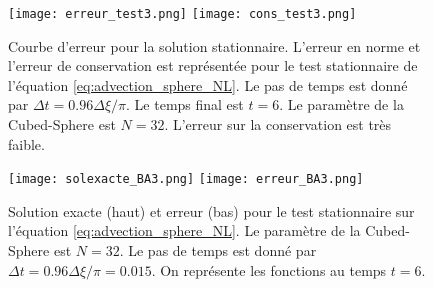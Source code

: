 \begin{figure}[htbp]
\begin{center}
\texttt{[image: erreur\_test3.png]}
\texttt{[image: cons\_test3.png]}
\end{center}
\caption{Courbe d'erreur pour la solution stationnaire. L'erreur en norme et l'erreur de conservation est représentée pour le test stationnaire de l'équation \eqref{eq:advection_sphere_NL}. Le pas de temps est donné par $\Delta t = 0.96 \Delta \xi / \pi$. Le temps final est $t=6$. Le paramètre de la Cubed-Sphere est $N=32$. L'erreur sur la conservation est très faible.}
\label{fig:benartzi_test3_hist}
\end{figure}

\begin{figure}[htbp]
\begin{center}
\texttt{[image: solexacte\_BA3.png]}
\texttt{[image: erreur\_BA3.png]}
\end{center}
\caption{Solution exacte (haut) et erreur (bas) pour le test stationnaire sur l'équation \eqref{eq:advection_sphere_NL}. Le paramètre de la Cubed-Sphere est $N=32$. Le pas de temps est donné par $\Delta t = 0.96 \Delta \xi / \pi = 0.015$. On représente les fonctions au temps $t=6$.}
\label{fig:benartzi_test3_sol}
\end{figure}


















